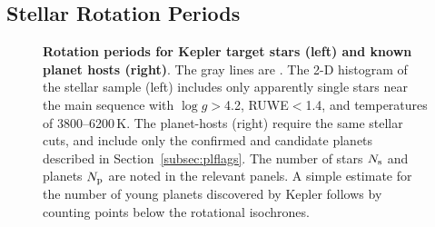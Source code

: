 \documentclass[11pt,twocolumn,tighten,linenumbers,trackchanges]{aastex63}
\begin{document}
\subsection{Stellar Rotation Periods}
\label{subsec:rotsel}


\begin{figure}[!t]
	\begin{center}
	\end{center}
	\vspace{-0.5cm}
	\caption{
    {\bf Rotation periods for Kepler target stars (left) and known
    planet hosts (right)}.  The gray lines are .  The 2-D histogram of the
    stellar sample (left) includes only apparently single stars near
    the main sequence with $\log g$$>$4.2, RUWE$<$1.4, and
    temperatures of 3800--6200\,K.  The planet-hosts (right) require
    the same stellar cuts, and include only the confirmed and
    candidate planets described in Section~\ref{subsec:plflags}.  The
    number of stars $N_{\rm s}$ and planets $N_{\rm p}$ are noted in
    the relevant panels.  A simple estimate for the number of young
    planets discovered by Kepler follows by counting points below the
    rotational isochrones.
	}
	\label{fig:prot_vs_teff}
\end{figure}
\end{document}
